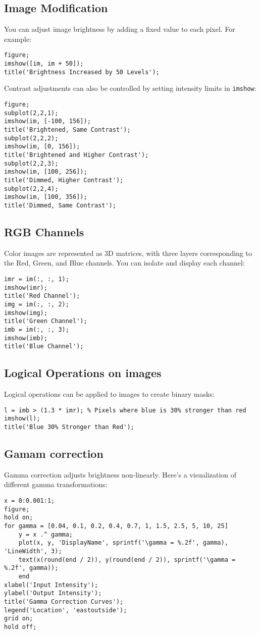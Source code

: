 \subsection{Image Modification}
You can adjust image brightness by adding a fixed value to each pixel. 
For example: 
\begin{lstlisting}[style=MATLAB] 
figure; 
imshow([im, im + 50]); 
title('Brightness Increased by 50 Levels'); 
\end{lstlisting}
Contrast adjustments can also be controlled by setting intensity limits in \texttt{imshow}: 
\begin{lstlisting}[style=MATLAB] 
figure; 
subplot(2,2,1); 
imshow(im, [-100, 156]); 
title('Brightened, Same Contrast'); 
subplot(2,2,2); 
imshow(im, [0, 156]); 
title('Brightened and Higher Contrast'); 
subplot(2,2,3); 
imshow(im, [100, 256]); 
title('Dimmed, Higher Contrast'); 
subplot(2,2,4); 
imshow(im, [100, 356]); 
title('Dimmed, Same Contrast'); 
\end{lstlisting}

\subsection{RGB Channels}
Color images are represented as 3D matrices, with three layers corresponding to the Red, Green, and Blue channels. 
You can isolate and display each channel: 
\begin{lstlisting}[style=MATLAB] 
imr = im(:, :, 1); 
imshow(imr); 
title('Red Channel'); 
img = im(:, :, 2); 
imshow(img); 
title('Green Channel'); 
imb = im(:, :, 3); 
imshow(imb); 
title('Blue Channel');
\end{lstlisting}

\subsection{Logical Operations on images}
Logical operations can be applied to images to create binary masks: 
\begin{lstlisting}[style=MATLAB] 
l = imb > (1.3 * imr); % Pixels where blue is 30% stronger than red 
imshow(l); 
title('Blue 30% Stronger than Red');
\end{lstlisting}

\subsection{Gamam correction}
Gamma correction adjusts brightness non-linearly. 
Here's a visualization of different gamma transformations: 
\begin{lstlisting}[style=MATLAB] 
x = 0:0.001:1; 
figure;
hold on; 
for gamma = [0.04, 0.1, 0.2, 0.4, 0.7, 1, 1.5, 2.5, 5, 10, 25] 
    y = x .^ gamma; 
    plot(x, y, 'DisplayName', sprintf('\gamma = %.2f', gamma), 'LineWidth', 3); 
    text(x(round(end / 2)), y(round(end / 2)), sprintf('\gamma = %.2f', gamma)); 
    end 
xlabel('Input Intensity'); 
ylabel('Output Intensity'); 
title('Gamma Correction Curves'); 
legend('Location', 'eastoutside'); 
grid on; 
hold off; 
\end{lstlisting}